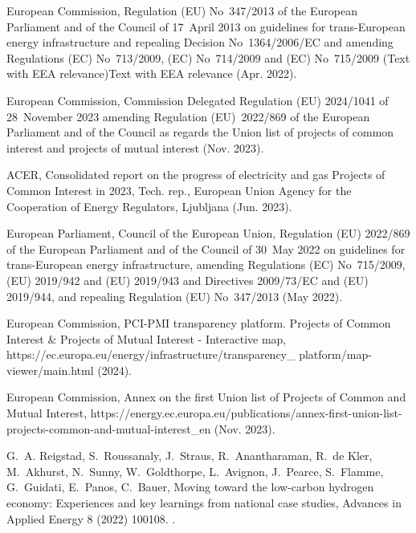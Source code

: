 \documentclass[preprint,12pt,sort&compress]{elsarticle}
\begin{document}
\begin{thebibliography}{10}
{European Commission}, Regulation ({{EU}}) {{No}}~347/2013 of the {{European Parliament}} and of the {{Council}} of 17~{{April}} 2013 on guidelines for trans-{{European}} energy infrastructure and repealing {{Decision No}}~1364/2006/{{EC}} and amending {{Regulations}} ({{EC}}) {{No}}~713/2009, ({{EC}}) {{No}}~714/2009 and ({{EC}}) {{No}}~715/2009 ({{Text}} with {{EEA}} relevance){{Text}} with {{EEA}} relevance (Apr. 2022).

{European Commission}, Commission {{Delegated Regulation}} ({{EU}}) 2024/1041 of 28~{{November}} 2023 amending {{Regulation}} ({{EU}})~2022/869 of the {{European Parliament}} and of the {{Council}} as regards the {{Union}} list of projects of common interest and projects of mutual interest (Nov. 2023).

ACER, Consolidated report on the progress of electricity and gas {{Projects}} of {{Common Interest}} in 2023, Tech. rep., European Union Agency for the Cooperation of Energy Regulators, Ljubljana (Jun. 2023).

{European Parliament}, {Council of the European Union}, Regulation ({{EU}}) 2022/869 of the {{European Parliament}} and of the {{Council}} of 30~{{May}} 2022 on guidelines for trans-{{European}} energy infrastructure, amending {{Regulations}} ({{EC}}) {{No}}~715/2009, ({{EU}}) 2019/942 and ({{EU}}) 2019/943 and {{Directives}} 2009/73/{{EC}} and ({{EU}}) 2019/944, and repealing {{Regulation}} ({{EU}}) {{No}}~347/2013 (May 2022).

{European Commission}, {{PCI-PMI}} transparency platform. {{Projects}} of {{Common Interest}} \& {{Projects}} of {{Mutual Interest}} - {{Interactive}} map, https://ec.europa.eu/energy/infrastructure/transparency\_ platform/map-viewer/main.html (2024).

{European Commission}, Annex on the first {{Union}} list of {{Projects}} of {{Common}} and {{Mutual Interest}}, https://energy.ec.europa.eu/publications/annex-first-union-list-projects-common-and-mutual-interest\_en (Nov. 2023).

G.~A. Reigstad, S.~Roussanaly, J.~Straus, R.~Anantharaman, R.~{de Kler}, M.~Akhurst, N.~Sunny, W.~Goldthorpe, L.~Avignon, J.~Pearce, S.~Flamme, G.~Guidati, E.~Panos, C.~Bauer, Moving toward the low-carbon hydrogen economy: {{Experiences}} and key learnings from national case studies, Advances in Applied Energy 8 (2022) 100108.
\newblock \href {https://doi.org/10.1016/j.adapen.2022.100108} {}.


\end{thebibliography}
\end{document}
